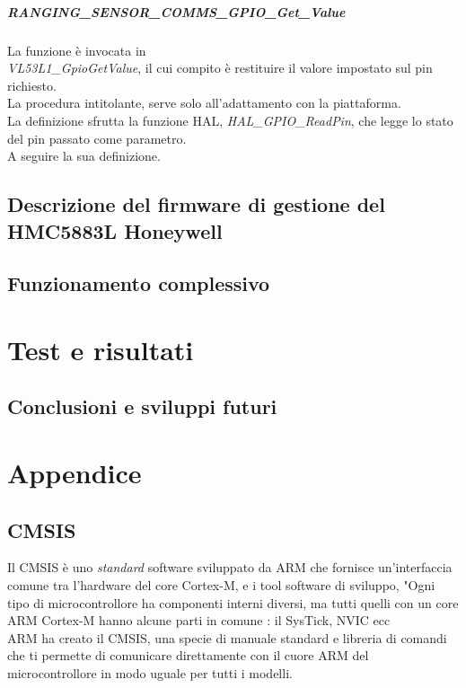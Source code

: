 \documentclass[11pt]{report}
\begin{document}
\paragraph{RANGING\_SENSOR\_COMMS\_GPIO\_Get\_Value}
La funzione è invocata in\\\textit{VL53L1\_GpioGetValue}, il cui compito è restituire il valore impostato sul pin richiesto.\\
La procedura intitolante, serve solo all'adattamento con la piattaforma.\\
La definizione sfrutta la funzione HAL, \textit{HAL\_GPIO\_ReadPin}, che legge lo stato del pin passato come parametro.\\
A seguire la sua definizione.


\section{Descrizione del firmware di gestione del HMC5883L Honeywell}
\section{Funzionamento complessivo}
\chapter{Test e risultati}
\newpage
{}
\section*{Conclusioni e sviluppi futuri}

\appendix
\chapter{Appendice}

\section{CMSIS}
Il CMSIS è uno \textit{standard} software sviluppato da ARM che
fornisce un'interfaccia comune tra l'hardware del core Cortex-M, e i tool software di sviluppo, "Ogni tipo di microcontrollore ha componenti interni 
diversi, ma tutti quelli con un core ARM Cortex-M hanno alcune parti in comune : il SysTick, NVIC ecc\\
ARM ha creato il CMSIS, una specie di manuale standard e libreria di comandi che ti permette di comunicare direttamente con il cuore ARM del microcontrollore in modo uguale per tutti i modelli.
\end{document}
